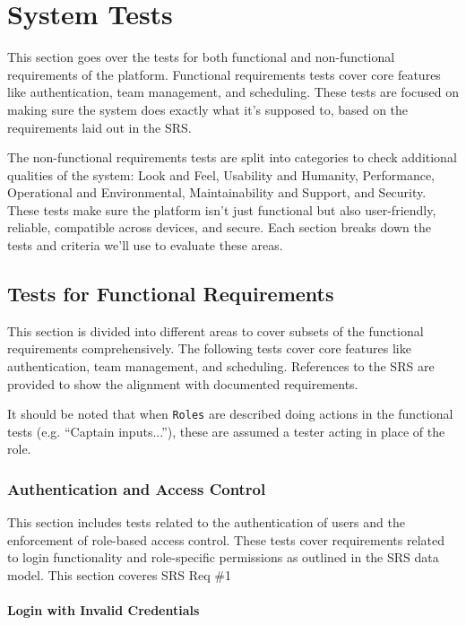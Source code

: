 \documentclass[12pt, titlepage]{article}
\begin{document}
\section{System Tests}

This section goes over the tests for both functional and non-functional requirements of the platform. Functional requirements tests cover core features like authentication, team management, and scheduling. These tests are focused on making sure the system does exactly what it’s supposed to, based on the requirements laid out in the SRS.

The non-functional requirements tests are split into categories to check additional qualities of the system: Look and Feel, Usability and Humanity, Performance, Operational and Environmental, Maintainability and Support, and Security. These tests make sure the platform isn’t just functional but also user-friendly, reliable, compatible across devices, and secure. Each section breaks down the tests and criteria we’ll use to evaluate these areas.

\subsection{Tests for Functional Requirements}

This section is divided into different areas to cover subsets of the functional requirements comprehensively. The following tests cover core features like authentication, team management, and scheduling. References to the SRS are provided to show the alignment with documented requirements.

It should be noted that when \texttt{Roles} are described doing actions in the functional tests (e.g. ``Captain inputs...''), these are assumed a tester acting in place of the role.

\subsubsection{Authentication and Access Control}

This section includes tests related to the authentication of users and the enforcement of role-based access control. These tests cover requirements related to login functionality and role-specific permissions as outlined in the SRS data model. This section coveres SRS Req \#1

\paragraph{Login with Invalid Credentials}
\end{document}
